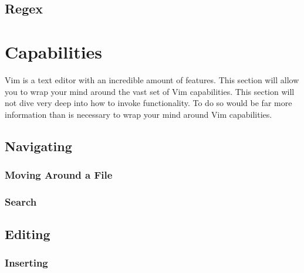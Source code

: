 \documentclass[12pt, oneside]{book}
\begin{document}
\section{Regex}

\chapter{Capabilities}
Vim is a text editor with an incredible amount of features.  This section will allow you to wrap your mind around the vast set of Vim capabilities.  This section will not dive very deep into how to invoke
functionality.  To do so would be far more information than is necessary to wrap your mind around Vim capabilities.
\section{Navigating}
  \subsection{Moving Around a File}
  \subsection{Search}
\section{Editing}
  \subsection{Inserting}
\end{document}
